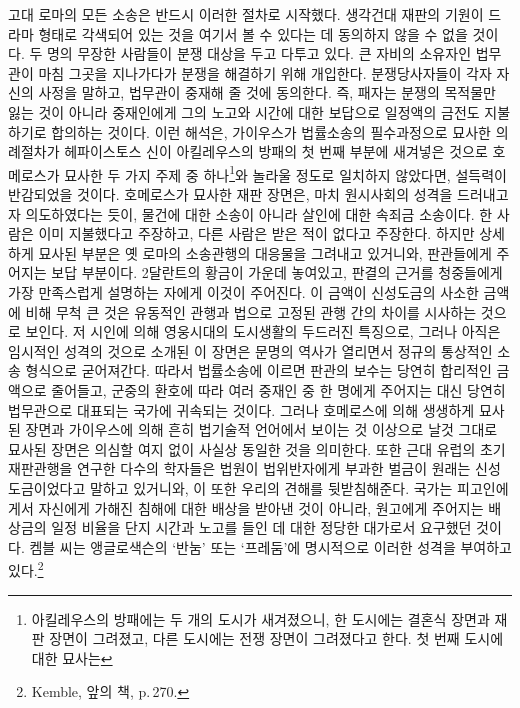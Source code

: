 고대 로마의 모든 소송은 반드시 이러한 절차로 시작했다.
생각건대
재판의 기원이 드라마 형태로 각색되어 있는 것을
여기서
볼 수 있다는 데
동의하지 않을 수 없을 것이다.
두 명의 무장한 사람들이 분쟁 대상을 두고 다투고 있다.
큰 자비의 소유자인 법무관이 마침
그곳을 지나가다가 분쟁을 해결하기 위해 개입한다.
분쟁당사자들이 각자 자신의 사정을 말하고,
법무관이 중재해 줄 것에 동의한다.
즉, 패자는 분쟁의 목적물만 잃는 것이 아니라
중재인에게 그의 노고와 시간에 대한 보답으로
일정액의 금전도 지불하기로 합의하는 것이다.
이런 해석은,
가이우스가 법률소송의 필수과정으로 묘사한
의례절차가
헤파이스토스 신이
아킬레우스의 방패의 첫 번째 부분에 새겨넣은 것으로
호메로스가 묘사한
두 가지 주제 중 하나\footnote{%
  아킬레우스의 방패에는 두 개의 도시가 새겨졌으니,
  한 도시에는 결혼식 장면과 재판 장면이 그려졌고,
  다른 도시에는 전쟁 장면이 그려졌다고 한다.
  첫 번째 도시에 대한 묘사는
}와
놀라울 정도로 일치하지 않았다면,
설득력이 반감되었을 것이다.
호메로스가 묘사한 재판 장면은,
마치 원시사회의 성격을 드러내고자 의도하였다는 듯이,
물건에 대한 소송이 아니라
살인에 대한 속죄금 소송이다.
한 사람은 이미 지불했다고 주장하고,
다른 사람은 받은 적이 없다고 주장한다.
하지만 상세하게 묘사된 부분은
옛 로마의 소송관행의 대응물을 그려내고 있거니와,
판관들에게 주어지는 보답 부분이다.
2달란트의 황금이 가운데 놓여있고,
판결의 근거를 청중들에게 가장 만족스럽게 설명하는 자에게
이것이 주어진다.
이 금액이 신성도금의 사소한 금액에 비해 무척 큰 것은
유동적인 관행과 법으로 고정된 관행 간의 차이를 시사하는 것으로 보인다.
저 시인에 의해
영웅시대의 도시생활의 두드러진 특징으로,
그러나 아직은 임시적인 성격의 것으로
소개된 이 장면은
문명의 역사가 열리면서
정규의 통상적인 소송 형식으로 굳어져간다.
따라서
법률소송에 이르면 판관의 보수는
당연히 합리적인 금액으로 줄어들고,
군중의 환호에 따라 여러 중재인 중 한 명에게 주어지는 대신
당연히 법무관으로 대표되는 국가에 귀속되는 것이다.
그러나
호메로스에 의해 생생하게 묘사된 장면과
가이우스에 의해
흔히 법기술적 언어에서 보이는 것 이상으로 날것 그대로
묘사된 장면은 의심할 여지 없이
사실상 동일한 것을 의미한다.
또한
근대 유럽의 초기 재판관행을 연구한 다수의 학자들은
법원이 법위반자에게 부과한 벌금이 원래는 신성도금이었다고
말하고 있거니와, 이 또한
우리의 견해를 뒷받침해준다.
국가는
피고인에게서
자신에게 가해진 침해에 대한 배상을
받아낸 것이 아니라,
원고에게 주어지는 배상금의 일정 비율을
단지
시간과 노고를 들인 데 대한 정당한 대가로서
요구했던 것이다.
켐블 씨는 앵글로색슨의
`반눔' 또는 `프레둠'에
명시적으로
이러한 성격을
부여하고 있다.\footnote{Kemble, 앞의 책, p.\,270.}

